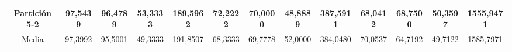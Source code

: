 \documentclass[12pt]{article}
\begin{document}
\begin{table}[H]
{\begin{tabular}{|c|cccc|cccc|cccc|}
Partición 5-2 & \multicolumn{1}{c|}{97,5439}                                                  & \multicolumn{1}{c|}{96,4789}                                                 & \multicolumn{1}{c|}{53,3333} & 189,5962 & \multicolumn{1}{c|}{72,2222}                                                  & \multicolumn{1}{c|}{70,0000}                                                 & \multicolumn{1}{c|}{48,8889} & 387,5911 & \multicolumn{1}{c|}{68,0412}                                                  & \multicolumn{1}{c|}{68,7500}                                                 & \multicolumn{1}{c|}{50,3597} & 1555,9471 \\ \hline
Media         & \multicolumn{1}{c|}{97,3992}                                                  & \multicolumn{1}{c|}{95,5001}                                                 & \multicolumn{1}{c|}{49,3333} & 191,8507 & \multicolumn{1}{c|}{68,3333}                                                  & \multicolumn{1}{c|}{69,7778}                                                 & \multicolumn{1}{c|}{52,0000} & 384,0480 & \multicolumn{1}{c|}{70,0537}                                                  & \multicolumn{1}{c|}{64,7192}                                                 & \multicolumn{1}{c|}{49,7122} & 1585,7971 \\ \hline
\end{tabular}}
\end{table}
\end{document}

